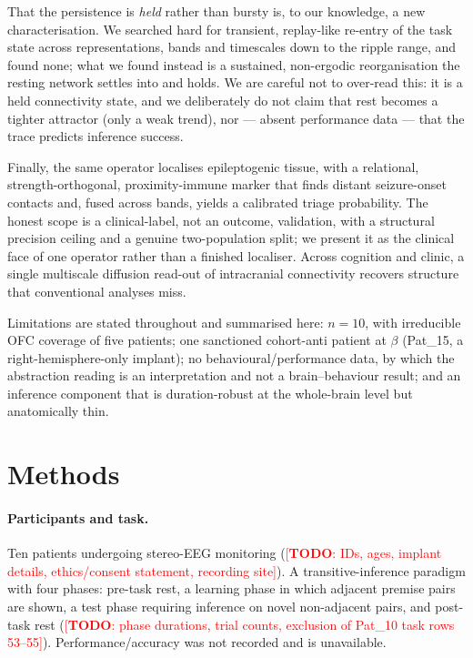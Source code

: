 \documentclass[11pt]{article}
\newcommand{\TODO}[1]{\textcolor{red}{[\textbf{TODO}: #1]}}
\begin{document}
That the persistence is \emph{held} rather than bursty is, to our knowledge, a
new characterisation. We searched hard for transient, replay-like re-entry of the
task state across representations, bands and timescales down to the ripple range,
and found none; what we found instead is a sustained, non-ergodic reorganisation
the resting network settles into and holds. We are careful not to over-read this:
it is a held connectivity state, and we deliberately do not claim that rest
becomes a tighter attractor (only a weak trend), nor --- absent performance data
--- that the trace predicts inference success.

Finally, the same operator localises epileptogenic tissue, with a relational,
strength-orthogonal, proximity-immune marker that finds distant seizure-onset
contacts and, fused across bands, yields a calibrated triage probability. The
honest scope is a clinical-label, not an outcome, validation, with a structural
precision ceiling and a genuine two-population split; we present it as the
clinical face of one operator rather than a finished localiser. Across cognition
and clinic, a single multiscale diffusion read-out of intracranial connectivity
recovers structure that conventional analyses miss.

Limitations are stated throughout and summarised here: $n=10$, with irreducible
OFC coverage of five patients; one sanctioned cohort-anti patient at $\beta$
(Pat\_15, a right-hemisphere-only implant); no behavioural/performance data, by
which the abstraction reading is an interpretation and not a brain--behaviour
result; and an inference component that is duration-robust at the whole-brain
level but anatomically thin.

\section{Methods}

\paragraph{Participants and task.}
Ten patients undergoing stereo-EEG monitoring
(\TODO{IDs, ages, implant details, ethics/consent statement, recording site}).
A transitive-inference paradigm with four phases: pre-task rest, a learning phase
in which adjacent premise pairs are shown, a test phase requiring inference on
novel non-adjacent pairs, and post-task rest
(\TODO{phase durations, trial counts, exclusion of Pat\_10 task rows 53--55}).
Performance/accuracy was not recorded and is unavailable.
\end{document}
